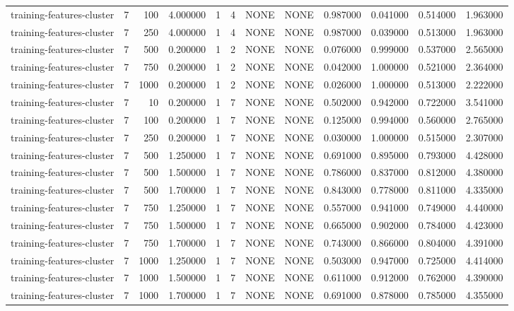 \begin{tabular}{lrrrllllrrrr}
training-features-cluster & 7 & 100 & 4.000000 & 1 & 4 & NONE & NONE & 0.987000 & 0.041000 & 0.514000 & 1.963000 \\
training-features-cluster & 7 & 250 & 4.000000 & 1 & 4 & NONE & NONE & 0.987000 & 0.039000 & 0.513000 & 1.963000 \\
training-features-cluster & 7 & 500 & 0.200000 & 1 & 2 & NONE & NONE & 0.076000 & 0.999000 & 0.537000 & 2.565000 \\
training-features-cluster & 7 & 750 & 0.200000 & 1 & 2 & NONE & NONE & 0.042000 & 1.000000 & 0.521000 & 2.364000 \\
training-features-cluster & 7 & 1000 & 0.200000 & 1 & 2 & NONE & NONE & 0.026000 & 1.000000 & 0.513000 & 2.222000 \\
training-features-cluster & 7 & 10 & 0.200000 & 1 & 7 & NONE & NONE & 0.502000 & 0.942000 & 0.722000 & 3.541000 \\
training-features-cluster & 7 & 100 & 0.200000 & 1 & 7 & NONE & NONE & 0.125000 & 0.994000 & 0.560000 & 2.765000 \\
training-features-cluster & 7 & 250 & 0.200000 & 1 & 7 & NONE & NONE & 0.030000 & 1.000000 & 0.515000 & 2.307000 \\
training-features-cluster & 7 & 500 & 1.250000 & 1 & 7 & NONE & NONE & 0.691000 & 0.895000 & 0.793000 & 4.428000 \\
training-features-cluster & 7 & 500 & 1.500000 & 1 & 7 & NONE & NONE & 0.786000 & 0.837000 & 0.812000 & 4.380000 \\
training-features-cluster & 7 & 500 & 1.700000 & 1 & 7 & NONE & NONE & 0.843000 & 0.778000 & 0.811000 & 4.335000 \\
training-features-cluster & 7 & 750 & 1.250000 & 1 & 7 & NONE & NONE & 0.557000 & 0.941000 & 0.749000 & 4.440000 \\
training-features-cluster & 7 & 750 & 1.500000 & 1 & 7 & NONE & NONE & 0.665000 & 0.902000 & 0.784000 & 4.423000 \\
training-features-cluster & 7 & 750 & 1.700000 & 1 & 7 & NONE & NONE & 0.743000 & 0.866000 & 0.804000 & 4.391000 \\
training-features-cluster & 7 & 1000 & 1.250000 & 1 & 7 & NONE & NONE & 0.503000 & 0.947000 & 0.725000 & 4.414000 \\
training-features-cluster & 7 & 1000 & 1.500000 & 1 & 7 & NONE & NONE & 0.611000 & 0.912000 & 0.762000 & 4.390000 \\
training-features-cluster & 7 & 1000 & 1.700000 & 1 & 7 & NONE & NONE & 0.691000 & 0.878000 & 0.785000 & 4.355000 \\

\end{tabular}
